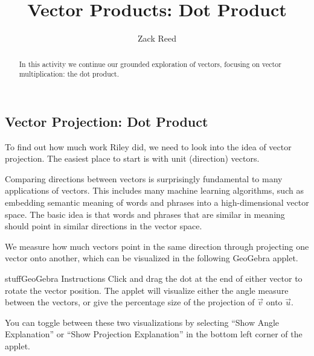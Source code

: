 \documentclass{ximera}
\title{Vector Products: Dot Product}
\author{Zack Reed}
\begin{document}
\begin{abstract}
In this activity we continue our grounded exploration of vectors, focusing on vector multiplication: the dot product.
\end{abstract}
\maketitle


\subsection*{Vector Projection: Dot Product}

To find out how much work Riley did, we need to look into the idea of vector projection. The easiest place to start is with unit (direction) vectors.

Comparing directions between vectors is surprisingly fundamental to many applications of vectors. This includes many machine learning algorithms, such as embedding semantic meaning of words and phrases into a high-dimensional vector space. The basic idea is that words and phrases that are similar in meaning should point in similar directions in the vector space. 


We measure how much vectors point in the same direction through projecting one vector onto another, which can be visualized in the following GeoGebra applet.

\begin{expandable}{stuff}{GeoGebra Instructions}
    Click and drag the dot at the end of either vector to rotate the vector position. The applet will visualize either the angle measure between the vectors, or give the percentage size of the projection of $\vec{v}$ onto $\vec{u}$.

    You can toggle between these two visualizations by selecting ``Show Angle Explanation'' or ``Show Projection Explanation'' in the bottom left corner of the applet.
\end{expandable}

\begin{center}
\end{center}
\end{document}

